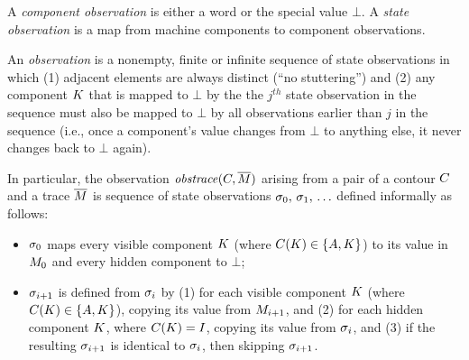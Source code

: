 \documentclass[conference]{IEEEtran}
\begin{document}

A {\em component observation} is either a word or the special value $\bot$.
A {\em state observation} is a map from machine components to component
observations.

An {\em observation} is a nonempty, finite or infinite sequence of state
observations in which (1) adjacent elements are always distinct (``no
stuttering'') and (2) any component $K$ that is mapped to $\bot$ by
the the $j^{th}$ state observation in the sequence must also be mapped to
$\bot$ by all observations earlier than $j$ in the sequence (i.e., once a
component's value changes from $\bot$ to anything else, it never changes
back to $\bot$ again).

In particular, the observation $\mathit{obstrace}(C, \overline{M})$
arising from a pair of a contour $C$ and a trace $\overline{M}$
is sequence of state observations $\sigma_0,\, \sigma_1,\,
\ldots$ defined informally as follows:
\begin{itemize}
\item $\sigma_0$ maps every visible component $K$ (where
  $C(K) \in \{A, K\}$) to its value in $M_0$
  and every hidden component to $\bot$;
\item $\sigma_{i+1}$ is defined from $\sigma_{i}$ by (1) for
  each visible component $K$ (where $C(K) \in
  \{A, K\}$), copying its value from $M_{i+1}$, and (2) for
  each hidden component $K$, where $C (K) =
  I$, copying its value from $\sigma_{i}$, and (3) if
  the resulting $\sigma_{i+1}$ is identical to $\sigma_{i}$,
  then skipping $\sigma_{i+1}$.  \iftext{}\fi
\end{itemize}
\end{document}
